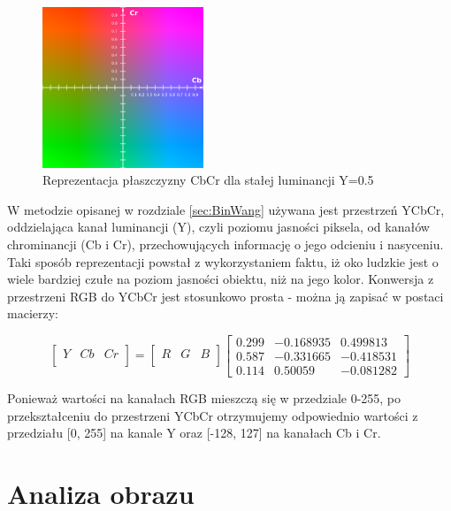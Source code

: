 \paragraph{}
\begin{figure}[!htb]
\centering
\includegraphics[width=182px]{img/YCbCr}
\caption{Reprezentacja płaszczyzny 
CbCr dla stałej luminancji Y=0.5}
\end{figure}
W metodzie opisanej w rozdziale \ref{sec:BinWang}  używana jest przestrzeń YCbCr, oddzielająca kanał luminancji (Y), czyli poziomu jasności piksela, od kanałów chrominancji (Cb i Cr), przechowujących informację o jego odcieniu i nasyceniu. Taki sposób reprezentacji powstał z wykorzystaniem faktu, iż oko ludzkie jest o wiele bardziej czułe na poziom jasności obiektu, niż na jego kolor. Konwersja z przestrzeni RGB do YCbCr jest stosunkowo prosta - można ją zapisać w postaci macierzy:

\[
\begin{bmatrix}
    Y & Cb & Cr \\
\end{bmatrix}
=
\begin{bmatrix}
    R & G & B \\
\end{bmatrix}
\begin{bmatrix}
    0.299 & -0.168935 & 0.499813 \\
    0.587 & -0.331665 & -0.418531 \\
    0.114 & 0.50059 & -0.081282 
\end{bmatrix}
\]


Ponieważ wartości na kanałach RGB mieszczą się w przedziale 0-255, po przekształceniu do przestrzeni YCbCr otrzymujemy odpowiednio wartości z przedziału [0, 255] na kanale Y oraz [-128, 127] na kanałach Cb i Cr.
\section{Analiza obrazu}  
